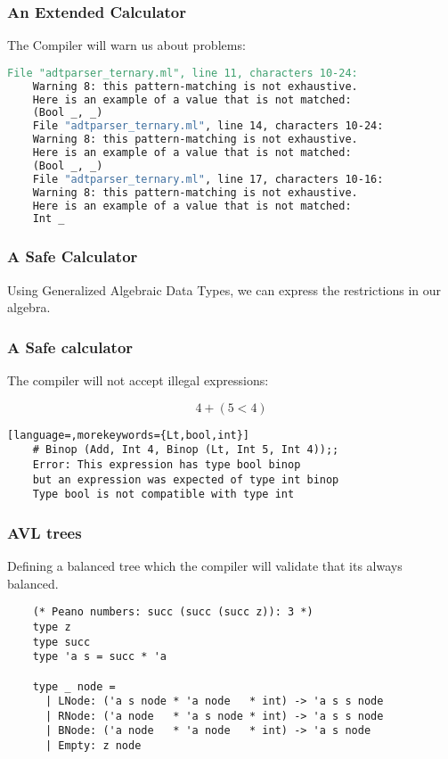 \documentclass[xcolor=svgnames]{beamer}
\renewcommand{\_}{\mathunderscore}
\begin{document}
\begin{frame}[fragile]
  \frametitle{An Extended Calculator}
  The Compiler will warn us about problems:
  \begin{lstlisting}[basicstyle={\footnotesize\ttfamily},language=make]
    File "adtparser_ternary.ml", line 11, characters 10-24:
    Warning 8: this pattern-matching is not exhaustive.
    Here is an example of a value that is not matched:
    (Bool _, _)
    File "adtparser_ternary.ml", line 14, characters 10-24:
    Warning 8: this pattern-matching is not exhaustive.
    Here is an example of a value that is not matched:
    (Bool _, _)
    File "adtparser_ternary.ml", line 17, characters 10-16:
    Warning 8: this pattern-matching is not exhaustive.
    Here is an example of a value that is not matched:
    Int _
  \end{lstlisting}

\end{frame}

\begin{frame}[fragile]
  \frametitle{A Safe Calculator}
  Using Generalized Algebraic Data Types, we can express the
  restrictions in our algebra.

  
\end{frame}

\begin{frame}[fragile]
  \frametitle{A Safe calculator}
  The compiler will not accept illegal expressions:

  \[4 + (5 < 4)\]

  \begin{lstlisting}[language=,morekeywords={Lt,bool,int}]
    # Binop (Add, Int 4, Binop (Lt, Int 5, Int 4));;
    Error: This expression has type bool binop
    but an expression was expected of type int binop
    Type bool is not compatible with type int
  \end{lstlisting}

\end{frame}

\begin{frame}[fragile]
  \frametitle{AVL trees}
  Defining a balanced tree which the compiler will validate that its
  always balanced.

  \begin{lstlisting}
    (* Peano numbers: succ (succ (succ z)): 3 *)
    type z
    type succ
    type 'a s = succ * 'a

    type _ node =
      | LNode: ('a s node * 'a node   * int) -> 'a s s node
      | RNode: ('a node   * 'a s node * int) -> 'a s s node
      | BNode: ('a node   * 'a node   * int) -> 'a s node
      | Empty: z node
  \end{lstlisting}

\end{frame}
\end{document}
